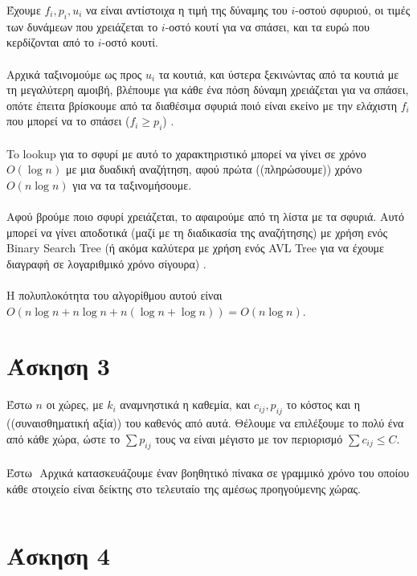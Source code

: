 \documentclass[12pt,a4paper]{article}
\begin{document}
    Έχουμε \( f_i, p_i, u_i \) να είναι αντίστοιχα η τιμή της δύναμης του \( i 
    \)-οστού σφυριού, οι τιμές των δυνάμεων που χρειάζεται το \( i \)-οστό κουτί
    για να σπάσει, και τα ευρώ που κερδίζονται από το \( i \)-οστό κουτί.\\
    \\
    Αρχικά ταξινομούμε ως προς \( u_i \) τα κουτιά, και ύστερα ξεκινώντας από τα
    κουτιά με τη μεγαλύτερη αμοιβή, βλέπουμε για κάθε ένα πόση δύναμη χρειάζεται
    για να σπάσει, οπότε έπειτα βρίσκουμε από τα διαθέσιμα σφυριά ποιό είναι
    εκείνο με την ελάχιστη \( f_i \) που μπορεί να το σπάσει (\( f_i \ge p_i \))
    .\\
    \\
    To {\latintext lookup} για το σφυρί με αυτό το χαρακτηριστικό μπορεί να
    γίνει σε χρόνο \( Ο(\log{n}) \) με μια δυαδική αναζήτηση, αφού πρώτα
    ((πληρώσουμε)) χρόνο \( Ο(n\log{n}) \) για να τα ταξινομήσουμε.\\
    \\
    Αφού βρούμε ποιο σφυρί χρειάζεται, το αφαιρούμε από τη λίστα με τα σφυριά.
    Αυτό μπορεί να γίνει αποδοτικά (μαζί με τη διαδικασία της αναζήτησης) με
    χρήση ενός {\latintext Binary Search Tree} (ή ακόμα καλύτερα με χρήση ενός
    {\latintext AVL Tree} για να έχουμε διαγραφή σε λογαριθμικό χρόνο σίγουρα)
    .\\
    \\
    Η πολυπλοκότητα του αλγορίθμου αυτού είναι \( O(n\log{n} + n\log{n} +
    n(\log{n} + \log{n})) = O(n\log{n}) \).

  \section{Άσκηση 3}
  
    Έστω \( n \) οι χώρες, με \( k_i \)
    αναμνηστικά η καθεμία, και \( c_{ij}, p_{ij} \) το κόστος και η
    ((συναισθηματική αξία)) του καθενός από αυτά. Θέλουμε να επιλέξουμε το πολύ
    ένα από κάθε χώρα, ώστε το \( \sum{p_{ij}} \) τους να είναι μέγιστο με τον
    περιορισμό \( \sum{c_{ij}} \le C \).\\
    \\
    Έστω \(  \)
    Αρχικά κατασκευάζουμε έναν βοηθητικό πίνακα σε γραμμικό χρόνο του οποίου
    κάθε στοιχείο είναι δείκτης στο τελευταίο της αμέσως προηγούμενης χώρας.

    \[  \]

  \section{Άσκηση 4}
  
\end{document}
